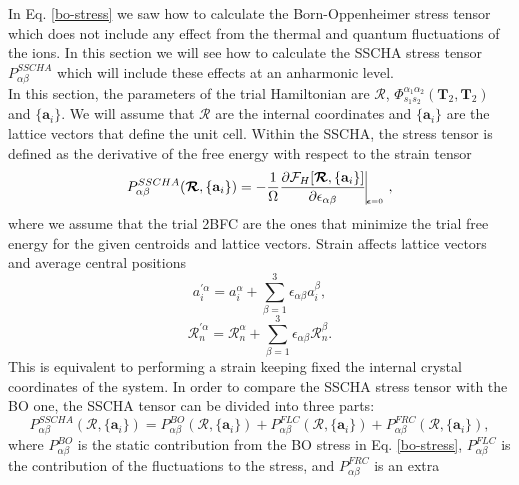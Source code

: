 In Eq. \ref{bo-stress} we saw how to calculate the Born-Oppenheimer stress tensor which does not include any effect from the thermal and quantum fluctuations of the ions. In this section we will see how to calculate 
the SSCHA stress tensor $P_{\alpha\beta}^{SSCHA}$ which will include these effects at an anharmonic level. \\

In this section, the parameters of the trial Hamiltonian are $\boldsymbol{\mathcal{R}}$, $\Phi_{s_{1}s_{2}}^{\alpha_{1}\alpha_{2}}(\mathbf{T}_{2},\mathbf{T}_{2})$ and $\{\mathbf{a}_{i}\}$. We will assume 
that $\boldsymbol{\mathcal{R}}$ are the internal coordinates and $\{\mathbf{a}_{i}\}$ are the lattice vectors that define the unit cell. Within the SSCHA, the stress tensor is defined as the derivative of the free energy 
with respect to the strain tensor
\begin{equation}
\label{scha-stress}
 P_{\alpha\beta}^{SSCHA}(\boldsymbol{\mathcal{R}},\{\mathbf{a}_{i}\})=-\frac{1}{\Omega}\frac{\partial\mathcal{F}_{H}[\boldsymbol{\mathcal{R}},\{\mathbf{a}_{i}\}]}{\partial\epsilon_{\alpha\beta}}\vline_{_{_{_{_{_{_{_{
\boldsymbol{\epsilon}=0}}}}}}}}, 
\end{equation}  
where we assume that the trial 2BFC are the ones that minimize the trial free energy for the given centroids and 
lattice vectors. Strain affects lattice vectors and average central positions 
\begin{equation}
a_{i}^{'\alpha}=a_{i}^{\alpha}+\sum_{\beta=1}^{3}\epsilon_{\alpha\beta}a_{i}^{\beta},
\end{equation}
\begin{equation}
\mathcal{R}_{n}^{'\alpha}=\mathcal{R}_{n}^{\alpha}+\sum_{\beta=1}^{3}\epsilon_{\alpha\beta}\mathcal{R}_{n}^{\beta}.
\end{equation}
This is equivalent to performing a strain keeping fixed the internal crystal coordinates of the system. In order to compare the SSCHA stress tensor with the BO one, the SSCHA tensor can be divided into three 
parts\cite{monacelli2018pressure}:
\begin{equation}
 P_{\alpha\beta}^{SSCHA}(\boldsymbol{\mathcal{R}},\{\mathbf{a}_{i}\})=P_{\alpha\beta}^{BO}(\boldsymbol{\mathcal{R}},\{\mathbf{a}_{i}\})+P_{\alpha\beta}^{FLC}(\boldsymbol{\mathcal{R}},\{\mathbf{a}_{i}\})+
 P_{\alpha\beta}^{FRC}(\boldsymbol{\mathcal{R}},\{\mathbf{a}_{i}\}),
\end{equation}
where $P_{\alpha\beta}^{BO}$ is the static contribution from the BO stress in Eq. \ref{bo-stress}, $P_{\alpha\beta}^{FLC}$ is the contribution of the fluctuations to the stress, and $P_{\alpha\beta}^{FRC}$ is an extra 
